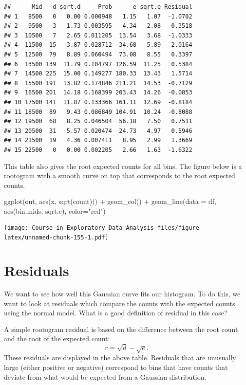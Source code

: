\documentclass[
]{book}
\newenvironment{Shaded}{\begin{snugshade}}{\end{snugshade}}
\newcommand{\AttributeTok}[1]{\textcolor[rgb]{0.77,0.63,0.00}{#1}}
\newcommand{\FunctionTok}[1]{\textcolor[rgb]{0.00,0.00,0.00}{#1}}
\newcommand{\NormalTok}[1]{#1}
\newcommand{\SpecialCharTok}[1]{\textcolor[rgb]{0.00,0.00,0.00}{#1}}
\newcommand{\StringTok}[1]{\textcolor[rgb]{0.31,0.60,0.02}{#1}}
\begin{document}
\begin{verbatim}
##      Mid   d sqrt.d     Prob      e sqrt.e Residual
## 1   8500   0   0.00 0.000948   1.15   1.07  -1.0702
## 2   9500   3   1.73 0.003595   4.34   2.08  -0.3518
## 3  10500   7   2.65 0.011205  13.54   3.68  -1.0333
## 4  11500  15   3.87 0.028712  34.68   5.89  -2.0164
## 5  12500  79   8.89 0.060494  73.08   8.55   0.3397
## 6  13500 139  11.79 0.104797 126.59  11.25   0.5384
## 7  14500 225  15.00 0.149277 180.33  13.43   1.5714
## 8  15500 191  13.82 0.174846 211.21  14.53  -0.7129
## 9  16500 201  14.18 0.168399 203.43  14.26  -0.0853
## 10 17500 141  11.87 0.133366 161.11  12.69  -0.8184
## 11 18500  89   9.43 0.086849 104.91  10.24  -0.8088
## 12 19500  68   8.25 0.046504  56.18   7.50   0.7511
## 13 20500  31   5.57 0.020474  24.73   4.97   0.5946
## 14 21500  19   4.36 0.007411   8.95   2.99   1.3669
## 15 22500   0   0.00 0.002205   2.66   1.63  -1.6322
\end{verbatim}

This table also gives the root expected counts for all bins. The figure below is a rootogram with a smooth curve on top that corresponds to the root expected counts.

\begin{Shaded}
\begin{Highlighting}[]
\FunctionTok{ggplot}\NormalTok{(out, }\FunctionTok{aes}\NormalTok{(x, }\FunctionTok{sqrt}\NormalTok{(count))) }\SpecialCharTok{+}
  \FunctionTok{geom\_col}\NormalTok{() }\SpecialCharTok{+}
  \FunctionTok{geom\_line}\NormalTok{(}\AttributeTok{data =}\NormalTok{ df,}
            \FunctionTok{aes}\NormalTok{(bin.mids, sqrt.e), }\AttributeTok{color=}\StringTok{"red"}\NormalTok{)}
\end{Highlighting}
\end{Shaded}

\texttt{[image: Course-in-Exploratory-Data-Analysis\_files/figure-latex/unnamed-chunk-155-1.pdf]}

\hypertarget{residuals}{%
\section{Residuals}\label{residuals}}

We want to see how well this Gaussian curve fits our histogram. To do this, we want to look at residuals which compare the counts with the expected counts using the normal model. What is a good definition of residual in this case?

A simple rootogram residual is based on the difference between the root count and the root of the expected count:
\[
r = \sqrt{d} - \sqrt{e}.
\]
These residuals are displayed in the above table. Residuals that are unusually large (either positive or negative) correspond to bins that have counts that deviate from what would be expected from a Gaussian distribution.
\end{document}
